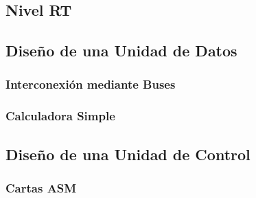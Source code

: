 \subsection{Nivel RT}
\subsection{Diseño de una Unidad de Datos}
\subsubsection{Interconexión mediante Buses}
\subsubsection{Calculadora Simple}
\subsection{Diseño de una Unidad de Control}
\subsubsection{Cartas ASM}